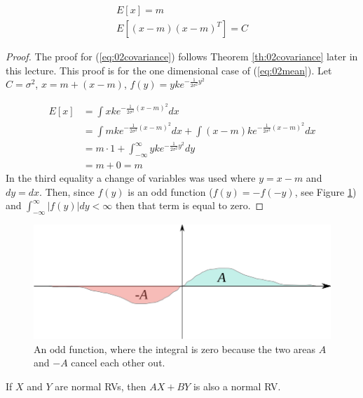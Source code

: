 \documentclass[lecture,12pt,]{pcms-l}
\theoremstyle{example}
\begin{document}
\begin{theorem}
\label{th:02mean}
\begin{align}
\label{eq:02mean}
E[x] = m \\
\label{eq:02covariance}
E[(x-m)(x-m)^T] = C
\end{align}
\end{theorem}
\begin{proof}
The proof for (\ref{eq:02covariance}) follows Theorem \ref{th:02covariance} later in this lecture. This proof is for the one dimensional case of (\ref{eq:02mean}). Let $C=\sigma^2$, $x=m+(x-m)$, $f(y)=yke^{-\frac{1}{2\sigma^2}y^2}$

\begin{align*}
E[x] &= \int xke^{-\frac{1}{2\sigma^2}(x-m)^2}dx \\
&= \int mke^{-\frac{1}{2\sigma^2}(x-m)^2}dx + \int(x-m)ke^{-\frac{1}{2\sigma^2}(x-m)^2}dx \\
&= m \cdot 1 + \int_{-\infty}^\infty yke^{-\frac{1}{2\sigma^2}y^2}dy \\
&= m + 0 = m
\end{align*}
In the third equality a change of variables was used where $y=x-m$ and $dy=dx$. Then, since $f(y)$ is an odd function ($f(y)=-f(-y)$, see Figure \ref{fig:02oddFunction}) and $\int_{-\infty}^\infty|f(y)|dy < \infty$ then that term is equal to zero.
\end{proof}
\begin{figure}[ht!]
	\centering
	\includegraphics[width=.5\textwidth]{images/02oddFunction}
	\caption{An odd function, where the integral is zero because the two areas $A$ and $-A$ cancel each other out.}
	\label{fig:02oddFunction}
\end{figure}

\begin{theorem}
If $X$ and $Y$ are normal RVs, then $AX+BY$ is also a normal RV.
\end{theorem}
\end{document}
